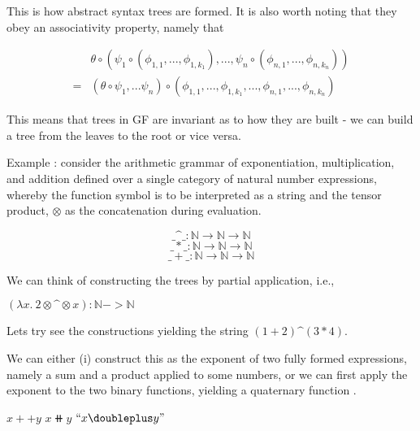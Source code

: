 This is how abstract syntax trees are formed. It is also worth noting that they
obey an associativity property, namely that 

\begin{align*}
&\theta \circ (\psi_1 \circ (\phi_{1,1},...,\phi_{1,k_1}),...,\psi_n \circ
(\phi_{n,1},...,\phi_{n,k_n}))\\ = &(\theta \circ \psi_1,...\psi_n) \circ (\phi_{1,1},...,\phi_{1,k_1},...,\phi_{n,1},...,\phi_{n,k_n})
\end{align*}

This means that trees in GF are invariant as to how they are built - we
can build a tree from the leaves to the root or vice versa.

Example : consider the arithmetic grammar of exponentiation, multiplication, and
addition defined over a single category of natural number expressions, whereby
the function symbol is to be interpreted as a string and the tensor product,
$\otimes$ as the concatenation during evaluation. 

$$\_\^{}\_ : \mathds{N} \to \mathds{N} \to \mathds{N}$$
$$\_*\_ : \mathds{N} \to \mathds{N} \to \mathds{N}$$
$$\_+\_ : \mathds{N} \to \mathds{N} \to \mathds{N}$$

We can think of constructing the trees by partial application, i.e., 

$(\lambda x.\: 2 \otimes \^{} \otimes x) : \mathds{N} -> \mathds{N}$

Lets try see the constructions yielding the string $(1 + 2) \^{} (3 * 4)$.

We can either (i) construct this as the exponent of two fully formed expressions,
namely a sum and a product applied to some numbers, or we can first apply the
exponent to the two binary functions, yielding a quaternary function .

$x ++ y$
$x \doubleplus y$
$``x \doubleplus y"$

